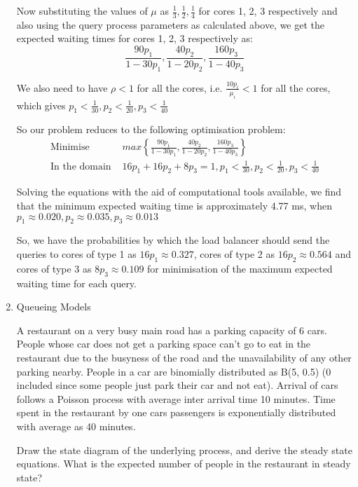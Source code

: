 \documentclass[12pt, oneside]{article}
\begin{document}
\begin{enumerate}
{    Now substituting the values of \(\mu\) as \(\frac{1}{3}, \frac{1}{2}, \frac{1}{4}\) for
    cores 1, 2, 3 respectively and also using the query process parameters as calculated above,
    we get the expected waiting times for cores 1, 2, 3 respectively as:
    \[
        \frac{90p_1}{1 - 30p_1}, \frac{40p_2}{1 - 20p_2}, \frac{160p_3}{1 - 40p_3}
    \]
    
    We also need to have \(\rho < 1\) for all the cores, i.e. \(\frac{10p_i}{\mu_i} < 1\) 
    for all the cores, which gives \(p_1 < \frac{1}{30}, p_2 < \frac{1}{20}, p_3 < \frac{1}{40}\)

    So our problem reduces to the following optimisation problem:
    \begin{align*}
        \text{Minimise } &max\left\{\frac{90p_1}{1 - 30p_1}, \frac{40p_2}{1 - 20p_2}, \frac{160p_3}{1 - 40p_3}\right\} \\
        \text{In the domain } &16p_1 + 16p_2 + 8p_3 = 1, p_1 < \frac{1}{30}, p_2 < \frac{1}{20}, p_3 < \frac{1}{40}
    \end{align*}

    Solving the equations with the aid of computational tools available, we find that the minimum expected waiting time
    is approximately 4.77 ms, when \(p_1 \approx 0.020, p_2 \approx 0.035, p_3 \approx 0.013\)

    So, we have the probabilities by which the load balancer should send the queries to
    cores of type 1 as \(16p_1 \approx 0.327\), cores of type 2 as \(16p_2 \approx 0.564\)
    and cores of type 3 as \(8p_3 \approx 0.109\) for minimisation of the maximum expected
    waiting time for each query.
}

\item {
    Queueing Models

    A restaurant on a very busy main road has a parking capacity of 6 cars. People whose car
    does not get a parking space can't go to eat in the restaurant due to the busyness of
    the road and the unavailability of any other parking nearby. People in a car are binomially
    distributed as B(5, 0.5) (0 included since some people just park their car and not eat). 
    Arrival of cars follows a Poisson process with average inter arrival time 10 minutes.
    Time spent in the restaurant by one cars passengers is exponentially distributed with 
    average as 40 minutes.

    Draw the state diagram of the underlying process, and derive the steady state equations.
    What is the expected number of people in the restaurant in steady state?

}
\end{enumerate}
\end{document}
